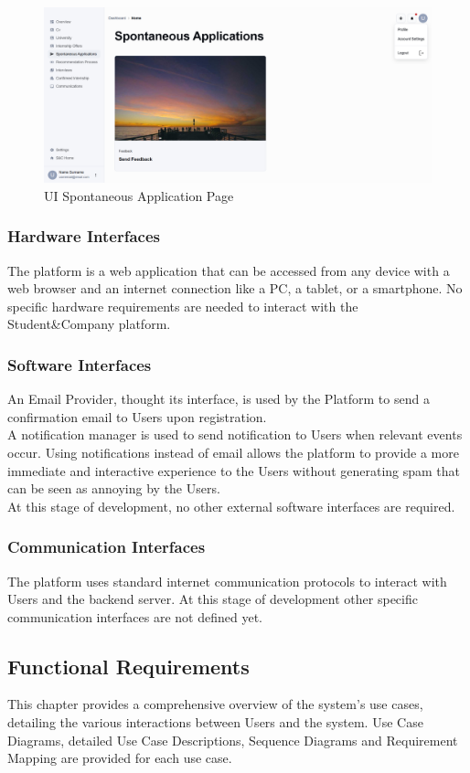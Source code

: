 \begin{figure}[H]
    \centering
    \includegraphics[width=\textwidth]{Latex/Images/SpontaneousApplication.png}
    \caption{UI Spontaneous Application Page}
    \label{fig:applicationspage}
\end{figure}

\subsubsection{Hardware Interfaces}
The platform is a web application that can be accessed from any device with a web browser and an internet connection like a PC, a tablet, or a smartphone. No specific hardware requirements are needed to interact with the Student\&Company platform.
\subsubsection{Software Interfaces}
An Email Provider, thought its interface, is used by the Platform to send a confirmation email to Users upon registration. \\
A notification manager is used to send notification to Users when relevant events occur. Using notifications instead of email allows the platform to provide a more immediate and interactive experience to the Users without generating spam that can be seen as annoying by the Users.\\
At this stage of development, no other external software interfaces are required.
\subsubsection{Communication Interfaces}
The platform uses standard internet communication protocols to interact with Users and the backend server. At this stage of development other specific communication interfaces are not defined yet.
\clearpage
\subsection{Functional Requirements}
This chapter provides a comprehensive overview of the system's use cases, detailing the various interactions between Users and the system.
Use Case Diagrams, detailed Use Case Descriptions, Sequence Diagrams and Requirement Mapping are provided for each use case.
